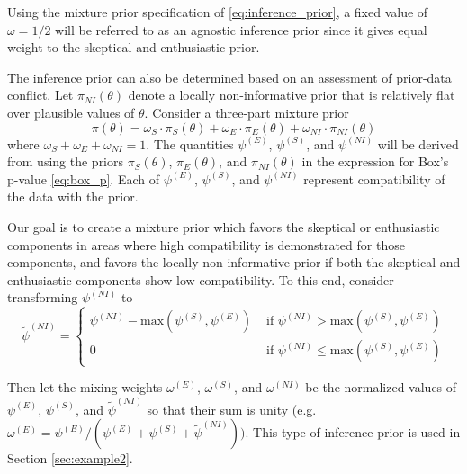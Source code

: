 \documentclass[useAMS,usenatbib,referee]{biom}
\begin{document}
Using the mixture prior specification of \eqref{eq:inference_prior}, a fixed value of $\omega=1/2$ will be referred to as an agnostic inference prior since it gives equal weight to the skeptical and enthusiastic prior.

The inference prior can also be determined based on an assessment of prior-data conflict. Let $\pi_{NI}(\theta)$ denote a locally non-informative prior that is relatively flat over plausible values of $\theta$. Consider a three-part mixture prior
\begin{equation}\label{eq:3partmix}
\pi(\theta)=\omega_S\cdot \pi_S(\theta)+\omega_E\cdot\pi_E(\theta)+\omega_{NI}\cdot\pi_{NI}(\theta)
\end{equation}
where $\omega_S+\omega_E+\omega_{NI}=1$. The quantities $\psi^{(E)}$, $\psi^{(S)}$, and $\psi^{(NI)}$ will be derived from using the priors $\pi_S(\theta)$, $\pi_E(\theta)$, and $\pi_{NI}(\theta)$ in the expression for Box's p-value \eqref{eq:box_p}. Each of $\psi^{(E)}$, $\psi^{(S)}$, and $\psi^{(NI)}$ represent compatibility of the data with the prior. 

Our goal is to create a mixture prior which favors the skeptical or enthusiastic components in areas where high compatibility is demonstrated for those components, and favors the locally non-informative prior if both the skeptical and enthusiastic components show low compatibility. To this end, consider transforming $\psi^{(NI)}$ to
\begin{equation}\label{eq:3partmix_ni}
\tilde{\psi}^{(NI)}=\begin{cases} 
      \psi^{(NI)}-\text{max}(\psi^{(S)},\psi^{(E)}) &\text{ if } \psi^{(NI)}>\text{max}(\psi^{(S)},\psi^{(E)})\\
      0& \text{ if } \psi^{(NI)}\leq\text{max}(\psi^{(S)},\psi^{(E)})
   \end{cases}
\end{equation}

Then let the mixing weights $\omega^{(E)}$, $\omega^{(S)}$, and $\omega^{(NI)}$ be the normalized values of $\psi^{(E)}$, $\psi^{(S)}$, and $\tilde{\psi}^{(NI)}$ so that their sum is unity (e.g. $\omega^{(E)}=\psi^{(E)}/(\psi^{(E)}+\psi^{(S)}+\tilde{\psi}^{(NI)}))$. This type of inference prior is used in Section \ref{sec:example2}.

%
\end{document}
